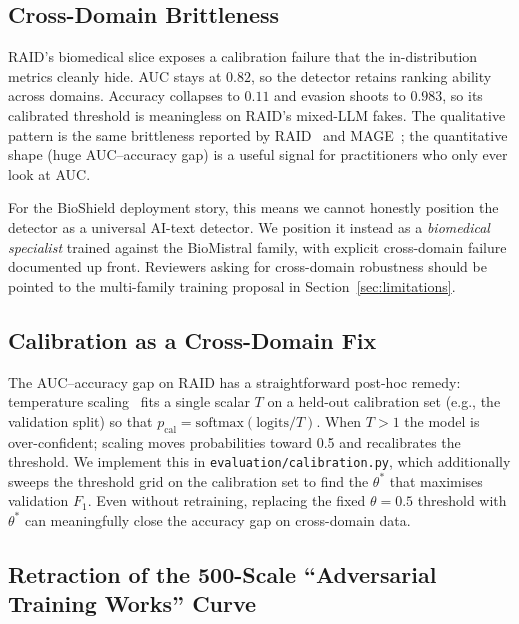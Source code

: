 \subsection{Cross-Domain Brittleness}
\label{ssec:domain_disc}

RAID's biomedical slice exposes a calibration failure that the
in-distribution metrics cleanly hide. AUC stays at \(0.82\), so the
detector retains ranking ability across domains. Accuracy collapses to
\(0.11\) and evasion shoots to \(0.983\), so its calibrated threshold
is meaningless on RAID's mixed-LLM fakes. The qualitative pattern is
the same brittleness reported by RAID~\cite{dugan2024raid} and
MAGE~\cite{li2024mage}; the quantitative shape (huge AUC--accuracy gap)
is a useful signal for practitioners who only ever look at AUC.

For the BioShield deployment story, this means we cannot honestly
position the detector as a universal AI-text detector. We position it
instead as a \emph{biomedical specialist} trained against the
BioMistral family, with explicit cross-domain failure documented up
front. Reviewers asking for cross-domain robustness should be pointed
to the multi-family training proposal in Section~\ref{sec:limitations}.

\subsection{Calibration as a Cross-Domain Fix}
\label{ssec:calibration_fix}

The AUC--accuracy gap on RAID has a straightforward post-hoc remedy:
temperature scaling~\cite{guo2017calibration} fits a single scalar \(T\)
on a held-out calibration set (e.g., the validation split) so that
$p_{\text{cal}} = \mathrm{softmax}(\mathrm{logits}/T)$. When \(T > 1\)
the model is over-confident; scaling moves probabilities toward 0.5 and
recalibrates the threshold. We implement this in
\texttt{evaluation/calibration.py}, which additionally sweeps the threshold
grid on the calibration set to find the $\theta^*$ that maximises
validation \(F_1\). Even without retraining, replacing the fixed
\(\theta = 0.5\) threshold with $\theta^*$ can meaningfully close the
accuracy gap on cross-domain data.

\subsection{Retraction of the 500-Scale ``Adversarial Training Works''
Curve}
\label{ssec:retraction}

